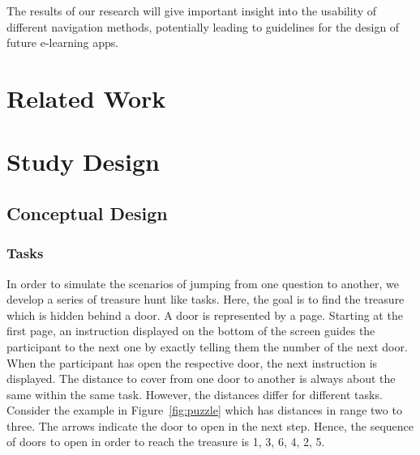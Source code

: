 \documentclass{sig-alternate-05-2015}
\begin{document}
The results of our research will give important insight into the usability of
different navigation methods, potentially leading to guidelines for the design
of future e-learning apps.
\section{Related Work}

\section{Study Design}
\subsection{Conceptual Design}
\subsubsection{Tasks}
In order to simulate the scenarios of jumping from one question to another, we
develop a series of treasure hunt like tasks. Here, the goal is to find the
treasure which is hidden behind a door. A door is represented by a page.
Starting at the first page, an instruction displayed on the bottom of the
screen guides the participant to the next one by exactly telling them the
number of the next door. When the participant has open the respective door,
the next instruction is displayed. The distance to cover from one door to
another is always about the same within the same task. However, the
distances differ for different tasks. Consider the example in
Figure~\ref{fig:puzzle} which has distances in range two to three. The arrows
indicate the door to open in the next step. Hence, the sequence of doors to
open in order to reach the treasure is 1, 3, 6, 4, 2, 5.
\end{document}
